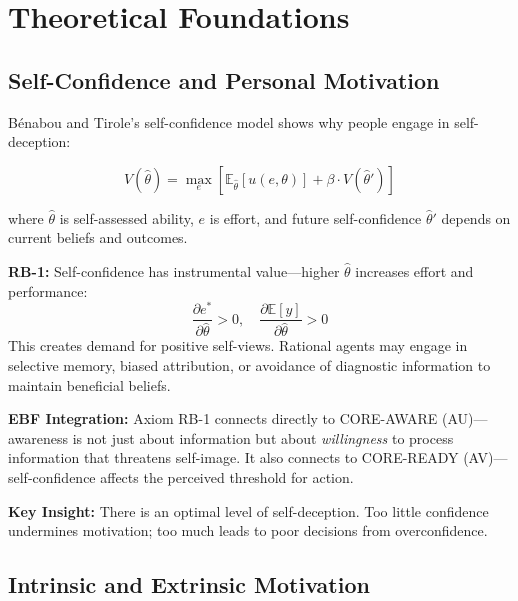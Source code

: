 \section{Theoretical Foundations}
\label{sec:rb-theory}

\subsection{Self-Confidence and Personal Motivation}
\label{subsec:rb-confidence}

Bénabou and Tirole's self-confidence model \citep{benabou_tirole_2002_self_confidence} shows why people engage in self-deception:

\begin{equation}
V(\hat{\theta}) = \max_e \left[ \mathbb{E}_{\hat{\theta}}[u(e, \theta)] + \beta \cdot V(\hat{\theta}') \right]
\label{eq:rb-confidence}
\end{equation}

where $\hat{\theta}$ is self-assessed ability, $e$ is effort, and future self-confidence $\hat{\theta}'$ depends on current beliefs and outcomes.

\begin{axiom}
\label{ax:rb-1}
\textbf{RB-1:} Self-confidence has instrumental value---higher $\hat{\theta}$ increases effort and performance:
\begin{equation}
\frac{\partial e^*}{\partial \hat{\theta}} > 0, \quad \frac{\partial \mathbb{E}[y]}{\partial \hat{\theta}} > 0
\end{equation}
This creates demand for positive self-views. Rational agents may engage in selective memory, biased attribution, or avoidance of diagnostic information to maintain beneficial beliefs.
\end{axiom}

\textbf{EBF Integration:} Axiom RB-1 connects directly to CORE-AWARE (AU)---awareness is not just about information but about \textit{willingness} to process information that threatens self-image. It also connects to CORE-READY (AV)---self-confidence affects the perceived threshold for action.

\textbf{Key Insight:} There is an optimal level of self-deception. Too little confidence undermines motivation; too much leads to poor decisions from overconfidence.

\subsection{Intrinsic and Extrinsic Motivation}
\label{subsec:rb-motivation}

